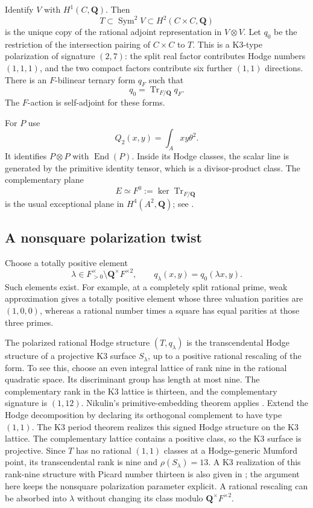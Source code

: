Identify $V$ with $H^1(C,\mathbf Q)$.  Then
\[
 T\subset \operatorname{Sym}^2V\subset H^2(C\times C,\mathbf Q)
\]
is the unique copy of the rational adjoint representation in $V\otimes V$.
Let $q_0$ be the restriction of the intersection pairing of $C\times C$
to $T$.  This is a K3-type polarization of signature $(2,7)$: the split
real factor contributes Hodge numbers $(1,1,1)$, and the two compact
factors contribute six further $(1,1)$ directions.  There is an
$F$-bilinear ternary form $q_F$ such that
\[
 q_0=\operatorname{Tr}_{F/\mathbf Q}q_F.
\]
The $F$-action is self-adjoint for these forms.

For $P$ use
\[
 Q_2(x,y)=\int_Axy\theta^2.
\]
It identifies $P\otimes P$ with $\operatorname{End}(P)$.  Inside its
Hodge classes, the scalar line is generated by the primitive identity
tensor, which is a divisor-product class.  The complementary plane
\[
 E\simeq F^0:=\ker\operatorname{Tr}_{F/\mathbf Q}
\]
is the usual exceptional plane in $H^4(A^2,\mathbf Q)$; see
\cite[Propositions 4.1--4.2]{Galluzzi}.

\subsection{A nonsquare polarization twist}

Choose a totally positive element
\[
 \lambda\in F^\times_{>0}\setminus\mathbf Q^\times F^{\times2},
 \qquad q_\lambda(x,y)=q_0(\lambda x,y).
\]
Such elements exist.  For example, at a completely split rational prime,
weak approximation gives a totally positive element whose three
valuation parities are $(1,0,0)$, whereas a rational number times a
square has equal parities at those three primes.

The polarized rational Hodge structure $(T,q_\lambda)$ is the
transcendental Hodge structure of a projective K3 surface $S_\lambda$,
up to a positive rational rescaling of the form.  To see this, choose
an even integral lattice of rank nine in the rational quadratic space.
Its discriminant group has length at most nine.  The complementary rank
in the K3 lattice is thirteen, and the complementary signature is
$(1,12)$.  Nikulin's primitive-embedding theorem applies
\cite[Theorem~1.12.4, pp.~122--123]{Nikulin}. Extend the Hodge decomposition by declaring its orthogonal complement to have type $(1,1)$. The K3 period theorem \cite[Theorem~1.7, p.~109]{MorrisonK3} realizes this signed Hodge structure on the K3 lattice.  The complementary lattice
contains a positive class, so the K3 surface is projective.  Since $T$
has no rational $(1,1)$ classes at a Hodge-generic Mumford point, its
transcendental rank is nine and $\rho(S_\lambda)=13$.
A K3 realization of this rank-nine structure with Picard number
thirteen is also given in
\cite[Appendix~A, Theorem~A23]{BBK3Sixfolds}; the argument here
keeps the nonsquare polarization parameter explicit.
A rational rescaling can be absorbed into $\lambda$ without changing
its class modulo $\mathbf Q^\times F^{\times2}$.

